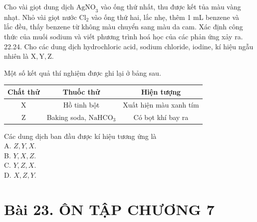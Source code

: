 \documentclass[10pt]{article}
\begin{document}
Cho vài giọt dung dịch $\mathrm{AgNO}_{3}$ vào ống thứ nhất, thu được kết tủa màu vàng nhạt. Nhỏ vài giọt nước $\mathrm{Cl}_{2}$ vào ống thứ hai, lắc nhẹ, thêm 1 mL benzene và\\
lắc đều, thấy benzene từ không màu chuyển sang màu da cam. Xác định công thức của muối sodium và viết phương trình hoá học của các phản ứng xảy ra.\\
22.24. Cho các dung dịch hydrochloric acid, sodium chloride, iodine, kí hiệu ngẫu nhiên là $\mathrm{X}, \mathrm{Y}, \mathrm{Z}$.

Một số kết quả thí nghiệm được ghi lại ở bảng sau.

\begin{center}
\begin{tabular}{|c|c|c|}
\hline
Chất thử & Thuốc thử & Hiện tượng \\
\hline
X & Hồ tinh bột & Xuất hiện màu xanh tím \\
\hline
Z & Baking soda, $\mathrm{NaHCO}_{3}$ & Có bọt khí bay ra \\
\hline
\end{tabular}
\end{center}

Các dung dịch ban đầu được kí hiệu tương ứng là\\
A. $Z, Y, X$.\\
B. $Y, X, Z$.\\
C. $Y, Z, X$.\\
D. $X, Z, Y$.

\section*{Bài 23. ÔN TẬP CHƯƠNG 7}
\end{document}
